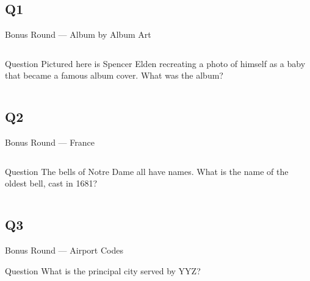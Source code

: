 \documentclass[11pt]{beamer}
\begin{document}
\subsection*{Q1}
\begin{frame}[t]{Bonus Round --- Album by Album Art}
\begin{columns}[T,totalwidth=\linewidth]
\begin{column}{0.32\linewidth}
\begin{block}{Question}
Pictured here is Spencer Elden recreating a photo of himself as a baby that became a famous album cover. What was the album?
\end{block}
\end{column}
\begin{column}{0.65\linewidth}
\begin{center}
\texttt{[image: \{Images/nevermind]}.jpg}
\end{center}
\end{column}
\end{columns}
\end{frame}
\subsection*{Q2}
\begin{frame}[t]{Bonus Round --- France}
\begin{columns}[T,totalwidth=\linewidth]
\begin{column}{0.32\linewidth}
\begin{block}{Question}
The bells of Notre Dame all have names.  What is the name of the oldest bell, cast in 1681?
\end{block}
\end{column}
\begin{column}{0.65\linewidth}
\begin{center}
\texttt{[image: \{Images/emannuelbell]}.jpg}
\end{center}
\end{column}
\end{columns}
\end{frame}
\subsection*{Q3}
\begin{frame}[t]{Bonus Round --- Airport Codes}
\begin{block}{Question}
What is the principal city served by YYZ\@?
\end{block}
\end{frame}
\end{document}
